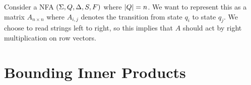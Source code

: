 \documentclass[12pt]{article}
\begin{document}
Consider a NFA \(\left(\Sigma, Q, \Delta, S, F\right)\)
where \(\left\lvert Q\right\rvert = n\).
We want to represent this as a matrix \(A_{n \times n}\)
where \(A_{i, j}\) denotes the transition from state \(q_i\)
to state \(q_j\).
We choose to read strings left to right, so this implies that
\(A\) should act by right multiplication on row vectors.



\section{Bounding Inner Products}




\printbibliography
\end{document}
